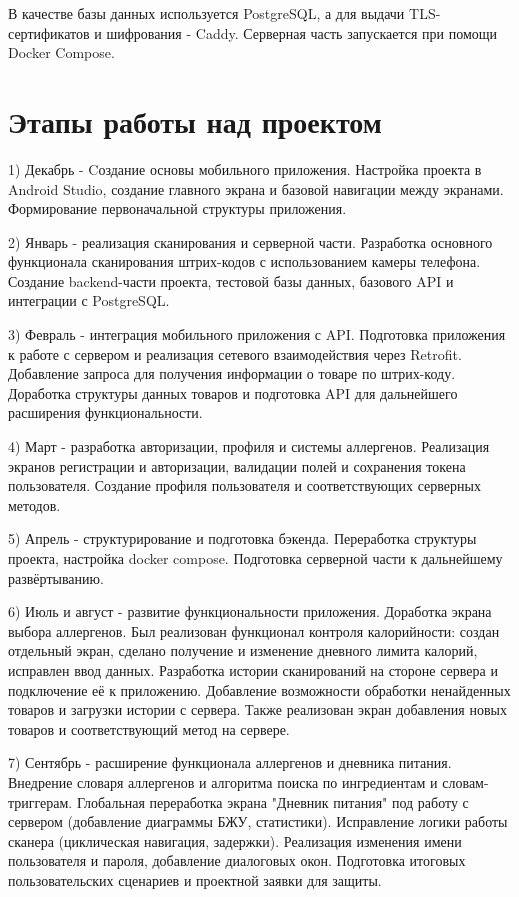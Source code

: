 \documentclass[14pt,a4paper]{extarticle}
\begin{document}
В качестве базы данных используется PostgreSQL, а для выдачи TLS-сертификатов и шифрования - Caddy.
Серверная часть запускается при помощи Docker Compose.



\section{Этапы работы над проектом}

1) Декабрь - Cоздание основы мобильного приложения.
Настройка проекта в Android Studio, создание главного экрана и базовой навигации между экранами. Формирование первоначальной структуры приложения.

2) Январь - реализация сканирования и серверной части.
Разработка основного функционала сканирования штрих-кодов с использованием камеры телефона. Создание backend-части проекта, тестовой базы данных, базового API и интеграции с PostgreSQL.

3) Февраль - интеграция мобильного приложения с API.
Подготовка приложения к работе с сервером и реализация сетевого взаимодействия через Retrofit. Добавление запроса для получения информации о товаре по штрих-коду. Доработка структуры данных товаров и подготовка API для дальнейшего расширения функциональности.

4) Март - разработка авторизации, профиля и системы аллергенов. Реализация экранов регистрации и авторизации, валидации полей и сохранения токена пользователя. Создание профиля пользователя и соответствующих серверных методов.

5) Апрель - структурирование и подготовка бэкенда.
Переработка структуры проекта, настройка docker compose. Подготовка серверной части к дальнейшему развёртыванию.

6) Июль и август - развитие функциональности приложения.
Доработка экрана выбора аллергенов. Был реализован функционал контроля калорийности: создан отдельный экран, сделано получение и изменение дневного лимита калорий, исправлен ввод данных. Разработка истории сканирований на стороне сервера и подключение её к приложению. Добавление возможности обработки ненайденных товаров и загрузки истории с сервера. Также реализован экран добавления новых товаров и соответствующий метод на сервере.

7) Сентябрь - расширение функционала аллергенов и дневника питания.
Внедрение словаря аллергенов и алгоритма поиска по ингредиентам и словам-триггерам. Глобальная переработка экрана "Дневник питания" под работу с сервером (добавление диаграммы БЖУ, статистики). Исправление логики работы сканера (циклическая навигация, задержки). Реализация изменения имени пользователя и пароля, добавление диалоговых окон. Подготовка итоговых пользовательских сценариев и проектной заявки для защиты.
\end{document}

